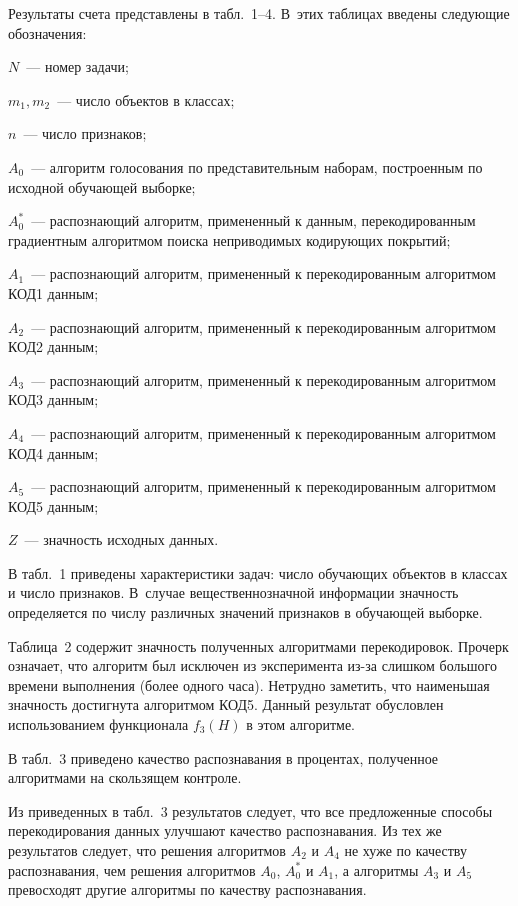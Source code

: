 \begin{multicols}{2}
Результаты счета представлены в табл.~1--4. В~этих таблицах введены
следующие обозначения:

$N$~--- номер задачи;

$m_1, m_2$~--- число объектов в классах;

$n$~--- число признаков;

$A_0$~--- алгоритм голосования по представительным наборам, построенным по исходной 
обуча\-ющей выборке;

$A^*_0$~--- распознающий алгоритм, примененный к данным,
перекодированным градиентным алгоритмом поиска неприводимых
кодирующих покрытий;

$A_1$~--- распознающий алгоритм, примененный к перекодированным алгоритмом КОД1 данным;

$A_2$~--- распознающий алгоритм, примененный к перекодированным алгоритмом КОД2 данным;

$A_3$~--- распознающий алгоритм, примененный к перекодированным алгоритмом КОД3 данным;

$A_4$~--- распознающий алгоритм, примененный к перекодированным алгоритмом КОД4 данным;

$A_5$~--- распознающий алгоритм, примененный к перекодированным алгоритмом КОД5 данным;

$Z$~--- значность исходных данных.

В табл.~1 приведены характеристики задач: чис\-ло обучающих объектов в
классах и число признаков. В~случае вещественнозначной информации
значность определяется по числу различных значений признаков в
обучающей выборке.



Таблица~2 содержит значность полученных алгоритмами перекодировок.
Прочерк означает, что алгоритм был исключен из эксперимента из-за
слишком большого времени выполнения (более одного часа). Нетрудно
заметить, что наименьшая значность достигнута алгоритмом КОД5.
Данный результат обусловлен использованием функционала $f_3(H)$ в
этом алгоритме.

В табл.~3 приведено качество распознавания в процентах, полученное
алгоритмами на скользящем контроле.

Из приведенных в табл.~3 результатов следует, что все предложенные
способы перекодирования данных улучшают качество распознавания. Из
тех же результатов следует, что решения алгоритмов $A_2$ и $A_4$ не
хуже по качеству распознавания, чем решения алгоритмов $A_0$,
$A^*_0$ и $A_1$, а алгоритмы $A_3$ и $A_5$ превосходят другие
алгоритмы по качеству распознавания.


\end{multicols}
